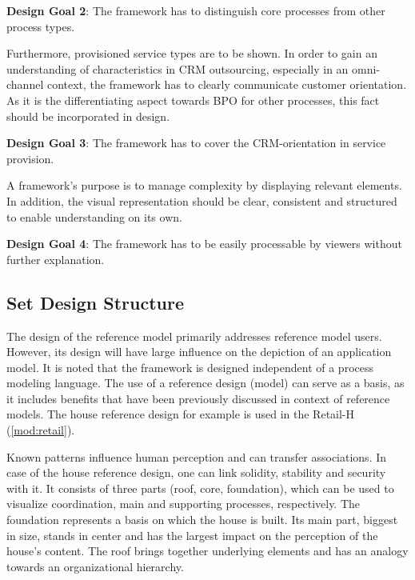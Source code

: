 	\hfill\begin{minipage}{\dimexpr\textwidth-1.2cm}
	\textbf{Design Goal 2}: The framework has to distinguish core processes from other process types. 
\end{minipage}

Furthermore, provisioned service types are to be shown. In order to gain an understanding of characteristics in CRM outsourcing, especially in an omni-channel context, the framework has to clearly communicate customer orientation. As it is the differentiating aspect towards BPO for other processes, this fact should be incorporated in design.  

	\hfill\begin{minipage}{\dimexpr\textwidth-1.2cm}
	\textbf{Design Goal 3}: The framework has to cover the CRM-orientation in service provision. 
\end{minipage}

A framework's purpose is to manage complexity by displaying relevant elements. In addition, the visual representation should be clear, consistent and structured to enable understanding on its own. 

	\hfill\begin{minipage}{\dimexpr\textwidth-1.2cm}
	\textbf{Design Goal 4}: The framework has to be easily processable by viewers without further explanation. 
\end{minipage}

	\subsection{Set Design Structure}
	
	The design of the reference model primarily addresses reference model users. However, its design will have large influence on the depiction of an application model. It is noted that the framework is designed independent of a process modeling language. The use of a reference design (model) can serve as a basis, as it includes benefits that have been previously discussed in context of reference models. The house reference design for example is used in the Retail-H (\cf \ref{mod:retail}).
	
	Known patterns influence human perception \citep{kroeber1997} and can transfer associations. In case of the house reference design, one can link solidity, stability and security \citep[]{Meise2001} with it. It consists of three parts (roof, core, foundation), which can be used to visualize coordination, main and supporting processes, respectively. The foundation represents a basis on which the house is built. Its main part, biggest in size, stands in center and has the largest impact on the perception of the house's content. The roof brings together underlying elements and has an analogy towards an organizational hierarchy. 
	
